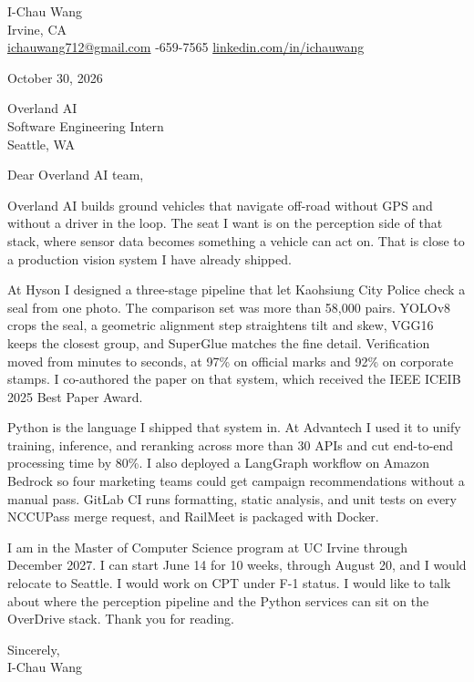\documentclass[11pt]{article}
\begin{document}
I-Chau Wang\\
Irvine, CA\\
\href{mailto:ichauwang712@gmail.com}{ichauwang712@gmail.com}
\quad\textbar{}-659-7565
\quad\textbar\quad
\href{https://linkedin.com/in/ichauwang}{linkedin.com/in/ichauwang}

\vspace{1.2em}

October 30, 2026

\vspace{1.2em}

Overland AI\\
Software Engineering Intern\\
Seattle, WA

\vspace{1.2em}

Dear Overland AI team,

Overland AI builds ground vehicles that navigate off-road without GPS and without a driver in the loop. The seat I want is on the perception side of that stack, where sensor data becomes something a vehicle can act on. That is close to a production vision system I have already shipped.

At Hyson I designed a three-stage pipeline that let Kaohsiung City Police check a seal from one photo. The comparison set was more than 58,000 pairs. YOLOv8 crops the seal, a geometric alignment step straightens tilt and skew, VGG16 keeps the closest group, and SuperGlue matches the fine detail. Verification moved from minutes to seconds, at 97\% on official marks and 92\% on corporate stamps. I co-authored the paper on that system, which received the IEEE ICEIB 2025 Best Paper Award.

Python is the language I shipped that system in. At Advantech I used it to unify training, inference, and reranking across more than 30 APIs and cut end-to-end processing time by 80\%. I also deployed a LangGraph workflow on Amazon Bedrock so four marketing teams could get campaign recommendations without a manual pass. GitLab CI runs formatting, static analysis, and unit tests on every NCCUPass merge request, and RailMeet is packaged with Docker.

I am in the Master of Computer Science program at UC Irvine through December 2027. I can start June 14 for 10 weeks, through August 20, and I would relocate to Seattle. I would work on CPT under F-1 status. I would like to talk about where the perception pipeline and the Python services can sit on the OverDrive stack. Thank you for reading.

\vspace{1.2em}

Sincerely,\\
I-Chau Wang
\end{document}
